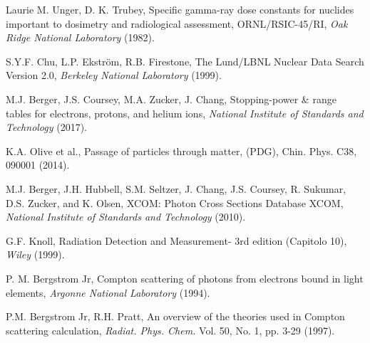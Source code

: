 \begin{thebibliography}{99} %

Laurie M. Unger, D. K. Trubey, Specific gamma-ray dose constants for nuclides important to dosimetry and radiological assessment, ORNL/RSIC-45/RI, \emph{Oak Ridge National Laboratory} (1982).

S.Y.F. Chu, L.P. Ekström, R.B. Firestone, The Lund/LBNL Nuclear Data Search Version 2.0, \emph{Berkeley National Laboratory} (1999).

M.J. Berger, J.S. Coursey, M.A. Zucker, J. Chang, Stopping-power \& range tables for electrons, protons, and helium ions, \emph{National Institute of Standards and Technology} (2017).

K.A. Olive et al., Passage of particles through matter, (PDG), Chin. Phys. C38, 090001 (2014).

M.J. Berger, J.H. Hubbell, S.M. Seltzer, J. Chang, J.S. Coursey, R. Sukumar, D.S. Zucker, and K. Olsen, XCOM: Photon Cross Sections Database XCOM, \emph{National Institute of Standards and Technology} (2010).

G.F. Knoll, Radiation Detection and Measurement- 3rd edition (Capitolo 10), \emph{Wiley} (1999).

P. M. Bergstrom Jr, Compton scattering of photons from electrons bound in light elements, \emph{Argonne National Laboratory} (1994).

P.M. Bergstrom Jr, R.H. Pratt, An overview of the theories used in Compton scattering calculation, \emph{Radiat. Phys. Chem.} Vol. 50, No. 1, pp. 3-29 (1997).

\end{thebibliography}

